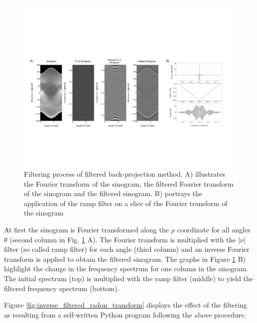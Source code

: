 \documentclass[12pt]{article}
\begin{document}
\begin{figure}[hbt]
	\includegraphics[width = 1\textwidth]{filtered/filtered_inverse_process.pdf}
	\caption{Filtering process of filtered back-projection method. A) illustrates the Fourier transform of the sinogram, the filtered Fourier transform of the sinogram and the filtered sinogram. B) portrays the application of the ramp filter on a slice of the Fourier transform of the sinogram}\label{fig:filtered_radon_transform}
\end{figure}
At first the sinogram is Fourier transformed along the $\rho$ coordinate for all angles $\theta$ (second column in Fig. \ref{fig:filtered_radon_transform} A). The Fourier transform is multiplied with the $|\nu|$ filter (so called ramp filter) for each angle (third column) and an inverse Fourier transform is applied to obtain the filtered sinogram. The graphs in Figure \ref{fig:filtered_radon_transform} B) highlight the change in the frequency spectrum for one column in the sinogram. The initial spectrum (top) is multiplied with the ramp filter (middle) to yield the filtered frequency spectrum (bottom).

Figure \ref{fig:inverse_filtered_radon_transform} displays the effect of the filtering as resulting from a self-written Python program following the above procedure. 
\end{document}
